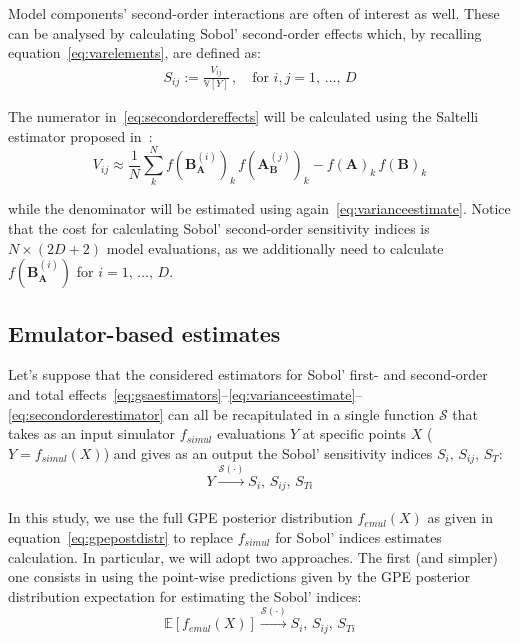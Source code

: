 \vspace{0.2cm}
Model components' second-order interactions are often of interest as well. These can be analysed by calculating Sobol' second-order effects which, by recalling equation~\eqref{eq:varelements}, are defined as:
%
\begin{align}\label{eq:secondordereffects}
    S_{ij} := \frac{V_{ij}}{\mathbb{V}[Y]}\,,\quad\text{for}\,\,i,j=1,\,\dots,\,D
\end{align}

\noindent
The numerator in~\eqref{eq:secondordereffects} will be calculated using the Saltelli estimator proposed in~\cite{Saltelli:2002}:
%
\begin{equation}\label{eq:secondorderestimator}
   V_{ij} \approx \frac{1}{N}\sum_{k}^{N}f(\mathbf{B}_{\mathbf{A}}^{(i)})_k\,f(\mathbf{A}_{\mathbf{B}}^{(j)})_k - f(\mathbf{A})_k\,f(\mathbf{B})_k
\end{equation}

\noindent
while the denominator will be estimated using again~\eqref{eq:varianceestimate}. Notice that the cost for calculating Sobol' second-order sensitivity indices is $N\times (2D + 2)$ model evaluations, as we additionally need to calculate $f(\mathbf{B}_{\mathbf{A}}^{(i)})$ for $i=1,\,\dots,\,D$.


%
%
%
\subsection{Emulator-based estimates}\label{sec:ch3emulatorbasedestimates}
Let's suppose that the considered estimators for Sobol' first- and second-order and total effects~\eqref{eq:gsaestimators}--\eqref{eq:varianceestimate}--\eqref{eq:secondorderestimator} can all be recapitulated in a single function $\mathcal{S}$ that takes as an input simulator $f_{simul}$ evaluations $Y$ at specific points $X$ ($Y=f_{simul}(X)$) and gives as an output the Sobol' sensitivity indices $S_i,\,S_{ij},\,S_{T}$:
%
\begin{equation}\label{eq:modelevalsgsa}
    Y\xrightarrow[]{\mathcal{S}(\cdot)} S_i,\,S_{ij},\,S_{Ti}
\end{equation}

\noindent
In this study, we use the full GPE posterior distribution $f_{emul}(X)$ as given in equation~\eqref{eq:gpepostdistr} to replace $f_{simul}$ for Sobol' indices estimates calculation. In particular, we will adopt two approaches. The first (and simpler) one consists in using the point-wise predictions given by the GPE posterior distribution expectation for estimating the Sobol' indices:
%
\begin{equation}\label{eq:emulmeangsa}
    \mathbb{E}[f_{emul}(X)]\xrightarrow[]{\mathcal{S}(\cdot)} S_i,\,S_{ij},\,S_{Ti}
\end{equation}

